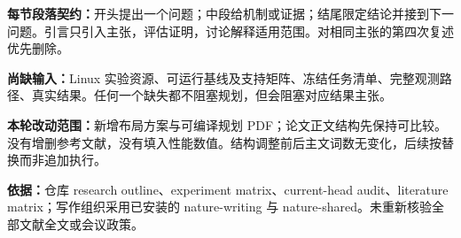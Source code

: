 \documentclass[UTF8,fontset=fandol,11pt]{ctexart}
\begin{document}
\textbf{每节段落契约：}开头提出一个问题；中段给机制或证据；结尾限定结论并接到下一问题。引言只引入主张，评估证明，讨论解释适用范围。对相同主张的第四次复述优先删除。

\textbf{尚缺输入：}Linux 实验资源、可运行基线及支持矩阵、冻结任务清单、完整观测路径、真实结果。任何一个缺失都不阻塞规划，但会阻塞对应结果主张。

\textbf{本轮改动范围：}新增布局方案与可编译规划 PDF；论文正文结构先保持可比较。没有增删参考文献，没有填入性能数值。结构调整前后主文词数无变化，后续按替换而非追加执行。

\textbf{依据：}仓库 research outline、experiment matrix、current-head audit、literature matrix；写作组织采用已安装的 nature-writing 与 nature-shared。未重新核验全部文献全文或会议政策。
\end{document}
